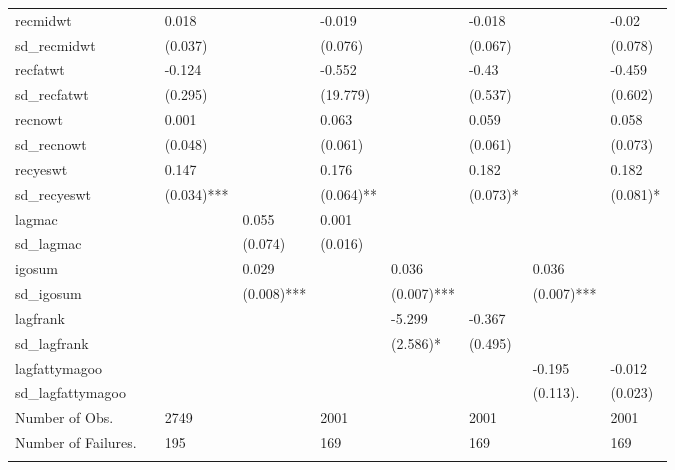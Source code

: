 \begin{table}[ht]
\begin{tabular}{lllllllll}
  recmidwt &  & 0.018 &  & -0.019 &  & -0.018 &  & -0.02 \\ 
  sd\_recmidwt &  & (0.037)  &  & (0.076)  &  & (0.067)  &  & (0.078)  \\ 
  recfatwt &  & -0.124 &  & -0.552 &  & -0.43 &  & -0.459 \\ 
  sd\_recfatwt &  & (0.295)  &  & (19.779)  &  & (0.537)  &  & (0.602)  \\ 
  recnowt &  & 0.001 &  & 0.063 &  & 0.059 &  & 0.058 \\ 
  sd\_recnowt &  & (0.048)  &  & (0.061)  &  & (0.061)  &  & (0.073)  \\ 
  recyeswt &  & 0.147 &  & 0.176 &  & 0.182 &  & 0.182 \\ 
  sd\_recyeswt &  & (0.034)*** &  & (0.064)** &  & (0.073)* &  & (0.081)* \\ 
  lagmac &  &  & 0.055 & 0.001 &  &  &  &  \\ 
  sd\_lagmac &  &  & (0.074)  & (0.016)  &  &  &  &  \\ 
  igosum &  &  & 0.029 &  & 0.036 &  & 0.036 &  \\ 
  sd\_igosum &  &  & (0.008)*** &  & (0.007)*** &  & (0.007)*** &  \\ 
  lagfrank &  &  &  &  & -5.299 & -0.367 &  &  \\ 
  sd\_lagfrank &  &  &  &  & (2.586)* & (0.495)  &  &  \\ 
  lagfattymagoo &  &  &  &  &  &  & -0.195 & -0.012 \\ 
  sd\_lagfattymagoo &  &  &  &  &  &  & (0.113). & (0.023)  \\ 
  Number of Obs. &  & 2749 &  & 2001 &  & 2001 &  & 2001 \\ 
  Number of Failures. &  & 195 &  & 169 &  & 169 &  & 169 \\ 
   \hline \footnotesize{  }
\end{tabular}
\end{table}
